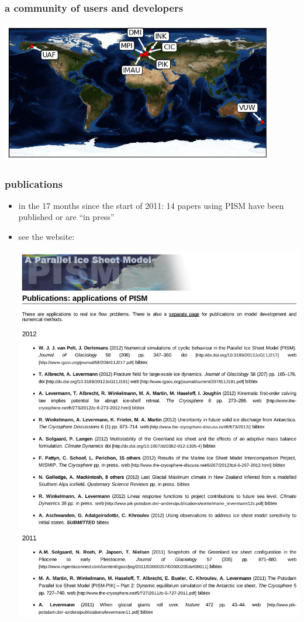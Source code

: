\documentclass[hide notes,intlimits]{beamer}
\begin{document}
\begin{frame}
  \frametitle{a community of users and developers}
 \begin{center}
    \includegraphics[width=120mm]{pism-users-map.png}
  \end{center}
\end{frame}


\begin{frame}
  \frametitle{publications}

  \begin{itemize}
  \item in the 17 months since the start of 2011: \alert{14 papers} using PISM have been published or are ``in press''
  \item see the website:
    \begin{center}
    \includegraphics[height=0.65\textheight]{publications}
    \end{center}
  \end{itemize}
\end{frame}
\end{document}
